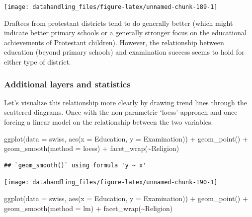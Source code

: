 \documentclass[
  12pt,
]{style/krantz}
\newenvironment{Shaded}{\begin{snugshade}}{\end{snugshade}}
\newcommand{\AttributeTok}[1]{\textcolor[rgb]{0.77,0.63,0.00}{#1}}
\newcommand{\FunctionTok}[1]{\textcolor[rgb]{0.00,0.00,0.00}{#1}}
\newcommand{\NormalTok}[1]{#1}
\newcommand{\SpecialCharTok}[1]{\textcolor[rgb]{0.00,0.00,0.00}{#1}}
\newcommand{\StringTok}[1]{\textcolor[rgb]{0.31,0.60,0.02}{#1}}
\begin{document}
\texttt{[image: datahandling\_files/figure-latex/unnamed-chunk-189-1]}

Draftees from protestant districts tend to do generally better (which might indicate better primary schools or a generally stronger focus on the educational achievements of Protestant children). However, the relationship between education (beyond primary schools) and examination success seems to hold for either type of district.

\hypertarget{additional-layers-and-statistics}{%
\subsubsection{Additional layers and statistics}\label{additional-layers-and-statistics}}

Let's visualize this relationship more clearly by drawing trend lines through the scattered diagrams. Once with the non-parametric `loess'-approach and once forcing a linear model on the relationship between the two variables.

\begin{Shaded}
\begin{Highlighting}[]
\FunctionTok{ggplot}\NormalTok{(}\AttributeTok{data =}\NormalTok{ swiss, }\FunctionTok{aes}\NormalTok{(}\AttributeTok{x =}\NormalTok{ Education, }\AttributeTok{y =}\NormalTok{ Examination)) }\SpecialCharTok{+}
     \FunctionTok{geom\_point}\NormalTok{() }\SpecialCharTok{+}
     \FunctionTok{geom\_smooth}\NormalTok{(}\AttributeTok{method =} \StringTok{\textquotesingle{}loess\textquotesingle{}}\NormalTok{) }\SpecialCharTok{+}
     \FunctionTok{facet\_wrap}\NormalTok{(}\SpecialCharTok{\textasciitilde{}}\NormalTok{Religion)}
\end{Highlighting}
\end{Shaded}

\begin{verbatim}
## `geom_smooth()` using formula 'y ~ x'
\end{verbatim}

\texttt{[image: datahandling\_files/figure-latex/unnamed-chunk-190-1]}

\begin{Shaded}
\begin{Highlighting}[]
\FunctionTok{ggplot}\NormalTok{(}\AttributeTok{data =}\NormalTok{ swiss, }\FunctionTok{aes}\NormalTok{(}\AttributeTok{x =}\NormalTok{ Education, }\AttributeTok{y =}\NormalTok{ Examination)) }\SpecialCharTok{+}
     \FunctionTok{geom\_point}\NormalTok{() }\SpecialCharTok{+}
     \FunctionTok{geom\_smooth}\NormalTok{(}\AttributeTok{method =} \StringTok{\textquotesingle{}lm\textquotesingle{}}\NormalTok{) }\SpecialCharTok{+}
     \FunctionTok{facet\_wrap}\NormalTok{(}\SpecialCharTok{\textasciitilde{}}\NormalTok{Religion)}
\end{Highlighting}
\end{Shaded}
\end{document}
